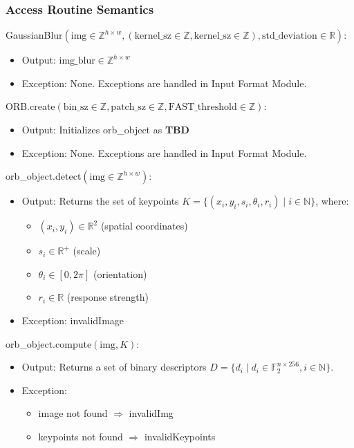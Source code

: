 \documentclass[12pt, titlepage]{article}
\begin{document}
\subsubsection{Access Routine Semantics}

\noindent GaussianBlur$(\text{img} \in \mathbb{Z}^{h \times w}, (\text{kernel\_sz} 
\in \mathbb{Z}, \text{kernel\_sz} \in \mathbb{Z}), \text{std\_deviation} \in \mathbb{R})$:
\begin{itemize}
    \item Output: $\text{img\_blur} \in \mathbb{Z}^{h \times w}$
    \item Exception: None. Exceptions are handled in Input Format Module.
\end{itemize}
\noindent ORB.create$(\text{bin\_sz} \in \mathbb{Z}, \text{patch\_sz} \in \mathbb{Z}, \text{FAST\_threshold} \in \mathbb{Z})$:
\begin{itemize}
    \item Output: Initializes orb\_object as \textbf{TBD}
    \item Exception: None. Exceptions are handled in Input Format Module.
\end{itemize}
\noindent orb\_object.detect$(\text{img} \in \mathbb{Z}^{h \times w})$:
\begin{itemize}
    \item Output: Returns the set of keypoints \( K = \{ (x_i, y_i, s_i, \theta_i, r_i) \mid i \in \mathbb{N} \} \), where:
    \begin{itemize}
        \item \( (x_i, y_i) \in \mathbb{R}^2 \) (spatial coordinates)
        \item \( s_i \in \mathbb{R}^+ \) (scale)
        \item \( \theta_i \in [0, 2\pi] \) (orientation)
        \item \( r_i \in \mathbb{R} \) (response strength)
    \end{itemize}
    \item Exception: invalidImage
\end{itemize}
\noindent orb\_object.compute$(\text{img}, K)$:
\begin{itemize}
    \item Output: Returns a set of binary descriptors 
    \( D = \{ d_i \mid d_i \in \mathbb{F}_2^{n\times 256}, i \in \mathbb{N} \} \).
    \item Exception:
    \begin{itemize}
      \item image not found $\Rightarrow$ invalidImg
      \item keypoints not found $\Rightarrow$ invalidKeypoints
    \end{itemize}
\end{itemize}
\end{document}
